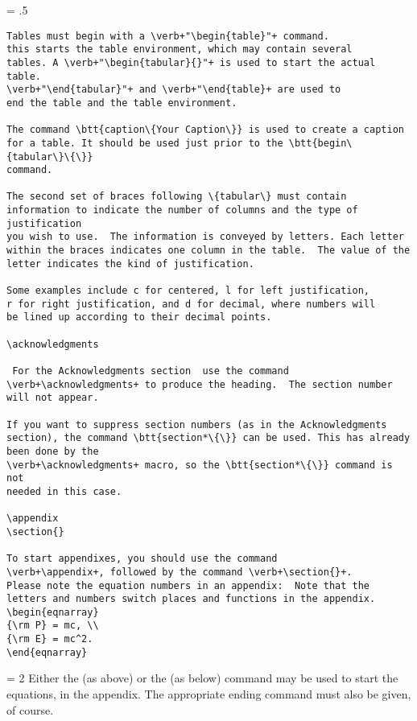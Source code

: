 \newpage
\baselineskip = .5\baselineskip  %
\begin{verbatim}
Tables must begin with a \verb+"\begin{table}"+ command.
this starts the table environment, which may contain several
tables. A \verb+"\begin{tabular}{}"+ is used to start the actual table.
\verb+"\end{tabular}"+ and \verb+"\end{table}+ are used to
end the table and the table environment.

The command \btt{caption\{Your Caption\}} is used to create a caption
for a table. It should be used just prior to the \btt{begin\{tabular\}\{\}}
command.

The second set of braces following \{tabular\} must contain
information to indicate the number of columns and the type of justification
you wish to use.  The information is conveyed by letters. Each letter
within the braces indicates one column in the table.  The value of the
letter indicates the kind of justification.

Some examples include c for centered, l for left justification,
r for right justification, and d for decimal, where numbers will
be lined up according to their decimal points.

\acknowledgments

 For the Acknowledgments section  use the command
\verb+\acknowledgments+ to produce the heading.  The section number
will not appear.

If you want to suppress section numbers (as in the Acknowledgments
section), the command \btt{section*\{\}} can be used. This has already
been done by the
\verb+\acknowledgments+ macro, so the \btt{section*\{\}} command is not
needed in this case.

\appendix
\section{}

To start appendixes, you should use the command
\verb+\appendix+, followed by the command \verb+\section{}+.
Please note the equation numbers in an appendix:  Note that the
letters and numbers switch places and functions in the appendix.
\begin{eqnarray}
{\rm P} = mc, \\
{\rm E} = mc^2.
\end{eqnarray}
\end{verbatim} \newpage
\baselineskip = 2\baselineskip  %
Either the  (as above) or the
 (as below)
command may be used to start the equations, in the appendix.  The
appropriate ending command must also be given, of course.

